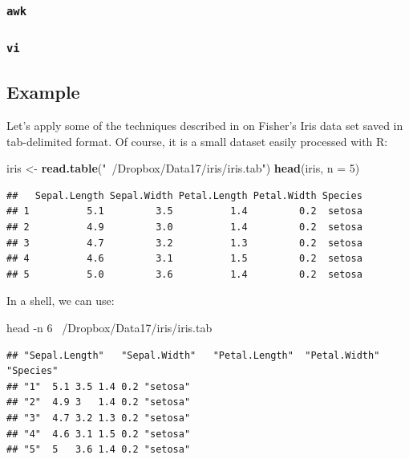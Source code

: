 \documentclass[]{book}
\newenvironment{Shaded}{\begin{snugshade}}{\end{snugshade}}
\newcommand{\KeywordTok}[1]{\textcolor[rgb]{0.13,0.29,0.53}{\textbf{#1}}}
\newcommand{\DataTypeTok}[1]{\textcolor[rgb]{0.13,0.29,0.53}{#1}}
\newcommand{\DecValTok}[1]{\textcolor[rgb]{0.00,0.00,0.81}{#1}}
\newcommand{\StringTok}[1]{\textcolor[rgb]{0.31,0.60,0.02}{#1}}
\newcommand{\FunctionTok}[1]{\textcolor[rgb]{0.00,0.00,0.00}{#1}}
\newcommand{\NormalTok}[1]{#1}
\theoremstyle{definition}
\theoremstyle{definition}
\theoremstyle{definition}
\theoremstyle{remark}
\begin{document}
\subsubsection{\texorpdfstring{\texttt{awk}}{awk}}\label{awk}

\subsubsection{\texorpdfstring{\texttt{vi}}{vi}}\label{vi}

\subsection{Example}\label{example}

Let's apply some of the techniques described in \citet{Blackwell2012} on
Fisher's Iris data set saved in tab-delimited format. Of course, it is a
small dataset easily processed with R:

\begin{Shaded}
\begin{Highlighting}[]
\NormalTok{iris <-}\StringTok{ }\KeywordTok{read.table}\NormalTok{(}\StringTok{"~/Dropbox/Data17/iris/iris.tab"}\NormalTok{)}
\KeywordTok{head}\NormalTok{(iris, }\DataTypeTok{n =} \DecValTok{5}\NormalTok{)}
\end{Highlighting}
\end{Shaded}

\begin{verbatim}
##   Sepal.Length Sepal.Width Petal.Length Petal.Width Species
## 1          5.1         3.5          1.4         0.2  setosa
## 2          4.9         3.0          1.4         0.2  setosa
## 3          4.7         3.2          1.3         0.2  setosa
## 4          4.6         3.1          1.5         0.2  setosa
## 5          5.0         3.6          1.4         0.2  setosa
\end{verbatim}

In a shell, we can use:

\begin{Shaded}
\begin{Highlighting}[]
\FunctionTok{head}\NormalTok{ -n 6 ~/Dropbox/Data17/iris/iris.tab}
\end{Highlighting}
\end{Shaded}

\begin{verbatim}
## "Sepal.Length"   "Sepal.Width"   "Petal.Length"  "Petal.Width"   "Species"
## "1"  5.1 3.5 1.4 0.2 "setosa"
## "2"  4.9 3   1.4 0.2 "setosa"
## "3"  4.7 3.2 1.3 0.2 "setosa"
## "4"  4.6 3.1 1.5 0.2 "setosa"
## "5"  5   3.6 1.4 0.2 "setosa"
\end{verbatim}
\end{document}
